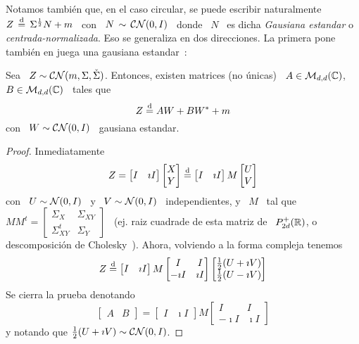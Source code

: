 Notamos tambi\'en que, en el caso  circular, se puede escribir naturalmente \ $Z
\, \stackrel{\mathrm{d}}{=} \, \Sigma^{\frac12} N + m$ \  con \ $N \, \sim \, \mathcal{C}\mathcal{N}(0,I)$ \ donde \
$N$ \  es dicha  {\em Gausiana estandar}  o {\em centrada-normalizada}.   Eso se
generaliza en dos direcciones.  La  primera pone tambi\'en en juega una gausiana
estandar~\cite{Lap17}:
%
\begin{teorema}
\label{Teo:MP:GausianaComplejaWWestrella}
%
Sea \  $Z \sim  \mathcal{C}\mathcal{N}(m,\Sigma,\check{\Sigma})$.  Entonces, existen  matrices (no
\'unicas) \ $A \in \mathcal{M}_{d,d}(\mathbb{C})$, \ $B \in \mathcal{M}_{d,d}(\mathbb{C})$ \ tales que
  \[
  Z \stackrel{\mathrm{d}}{=} A W + B W^* + m
  \]
  con \ $W \sim \mathcal{C}\mathcal{N}(0,I)$ \ gausiana estandar.
\end{teorema}
\begin{proof}
  Inmediatamente
  \[
  Z   =  \begin{bmatrix}   I   &  \imath   I\end{bmatrix}  \begin{bmatrix}   X\\
    Y\end{bmatrix}
  \stackrel{\mathrm{d}}{=} \begin{bmatrix} I & \imath I\end{bmatrix} M \begin{bmatrix} U\\
    V\end{bmatrix}
  \]
  con \ $U \sim \mathcal{N}(0,I)$ \ y \  $V \sim \mathcal{N}(0,I)$ \ independientes, y \ $M$ \ tal
  que  \ $M  M^t =  \begin{bmatrix} \Sigma_X  & \Sigma_{XY}  \\  \Sigma_{XY}^t &
    \Sigma_Y  \end{bmatrix}$  \   (ej.  raiz  cuadrade  de  esta   matriz  de  \
  $P_{2d}^+(\mathbb{R})$,    o     descomposici\'on    de    Cholesky~\cite{HorJoh13,
    Bha07}). Ahora, volviendo a la forma compleja tenemos
  \[
  Z     \stackrel{\mathrm{d}}{=}   \begin{bmatrix}    I   &   \imath   I\end{bmatrix}
  M \begin{bmatrix} I  & I\\ -\imath I &  \imath I \end{bmatrix} \begin{bmatrix}
    \frac12 (U + \imath V)\\ \frac12 (U - \imath V)\end{bmatrix}
  \]
  Se cierra la prueba denotando
  \[
  \begin{bmatrix}   A   &   B\end{bmatrix}   =  \begin{bmatrix} I &
    \imath  I\end{bmatrix}  M  \begin{bmatrix}  I  &  I\\  -\imath  I  &  \imath
    I \end{bmatrix}
  \]
  y notando que $\frac12 (U + \imath V) \sim \mathcal{C}\mathcal{N}(0,I)$.
\end{proof}
